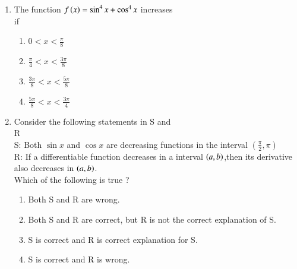 \documentclass[journal]{IEEEtran}
\begin{document}
\begin{enumerate}[start=9]
\item The function $f\left(x\right)= \sin^4{x}+\cos^4{x}$ increases \\
if \hfill {}
\begin{multicols}{2}
\begin{enumerate}
    \item $0<x<\displaystyle\frac{\pi}{8}$\\
    \item $\displaystyle\frac{\pi}{4}<x<\displaystyle\frac{3\pi}{8}$\\
    \item $\displaystyle\frac{3\pi}{8} <x<\displaystyle\frac{5\pi}{8}$\\
    \item $\displaystyle\frac{5\pi}{8}<x<\displaystyle\frac{3\pi}{4}$\\
\end{enumerate}
\end{multicols}
\item Consider the following statements in S and \\
R \hfill {}\\
S: Both $\sin{x}$ and $\cos{x}$ are decreasing functions in the interval $\left(\displaystyle\frac{\pi}{2},\pi\right)$\\
R: If a differentiable function decreases in a interval $\left(a,b\right)$,then its derivative also decreases in $\left(a,b\right)$.\\
Which of the following is true ?
\begin{enumerate}
    \item Both S and R are wrong.
    \item Both S and R are correct, but R is not the correct explanation of S.
    \item S is correct and R is correct explanation for S.
    \item S is correct and R is wrong.\\
\end{enumerate}


\end{enumerate}
\end{document}
